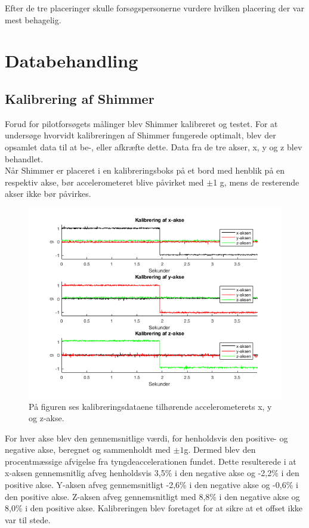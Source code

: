 Efter de tre placeringer skulle forsøgspersonerne vurdere hvilken placering der var mest behagelig.

\section{Databehandling}
\subsection{Kalibrering af Shimmer}
Forud for pilotforsøgets målinger blev Shimmer kalibreret og testet. For at undersøge hvorvidt kalibreringen af Shimmer fungerede optimalt, blev der opsamlet data til at be-, eller afkræfte dette. Data fra de tre akser, x, y og z blev behandlet. \\
Når Shimmer er placeret i en kalibreringsboks på et bord med henblik på en respektiv akse, bør accelerometeret blive påvirket med $\pm$1 g, mens de resterende akser ikke bør påvirkes.

\begin{figure}[H]
	\centering
	\includegraphics[scale=0.68]{figures/qBilag/kalibreringsdata}
	\caption{På figuren ses kalibreringsdataene tilhørende accelerometerets x, y og z-akse.}
	\label{fig:Ap_Kalibrering}
\end{figure}

For hver akse blev den gennemsnitlige værdi, for henholdsvis den positive- og negative akse, beregnet og sammenholdt med $\pm 1$g. Dermed blev den procentmæssige afvigelse fra tyngdeaccelerationen fundet. Dette resulterede i at x-aksen gennemsnitlig afveg henholdsvis 3,5\% i den negative akse og -2,2\% i den positive akse. Y-aksen afveg gennemsnitligt -2,6\% i den negative akse og -0,6\% i den positive akse. Z-aksen afveg  gennemsnitligt med 8,8\% i den negative akse og 8,0\% i den positive akse. \newline
Kalibreringen blev foretaget for at sikre at et offset ikke var til stede. 

